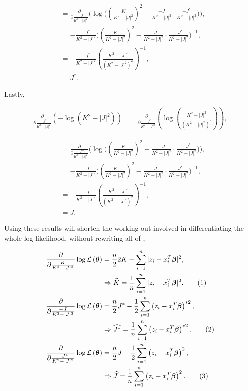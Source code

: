 \documentclass[honours,12pt]{unswthesis}
\newcommand{\ta}{\bm{\theta}}
\newcommand{\covdet}{K^{2} - |J|^{2}}
\def\implies{\Rightarrow}
\newcommand\numberthis{\addtocounter{equation}{1}\tag{\theequation}}
\numberwithin{equation}{section}
\begin{document}
\begin{align*}
    &= \frac{\partial}{\partial \frac{-J}{\covdet}} \Bigg( \log \Bigg( \left( \frac{K}{\covdet} \right)^{2} - \frac{-J}{\covdet} \cdot \frac{-J^{*}}{\covdet} \Bigg) \Bigg),\\
    &= -\frac{-J^{*}}{\covdet} \Bigg( \left( \frac{K}{\covdet} \right)^{2} - \frac{-J}{\covdet} \cdot \frac{-J^{*}}{\covdet} \Bigg)^{-1}, \\
    &= -\frac{-J^{*}}{\covdet} \left( \frac{\covdet}{\left( \covdet \right)^{2}} \right)^{-1},\\
    &= J^{*}.
\end{align*}

\noindent Lastly,

\begin{align*}
    \frac{\partial}{\partial \frac{-J^{*}}{\covdet}} \left( - \log{ \left( \covdet \right)} \right) &= \frac{\partial}{\partial \frac{-J^{*}}{\covdet}} \left( \log{ \left( \frac{\covdet}{\left( \covdet \right)^{2}} \right)} \right),
\end{align*}

\begin{align*}
    &= \frac{\partial}{\partial \frac{-J{*}}{\covdet}} \Bigg( \log \Bigg( \left( \frac{K}{\covdet} \right)^{2} - \frac{-J}{\covdet} \cdot \frac{-J^{*}}{\covdet} \Bigg) \Bigg),\\
    &= -\frac{-J}{\covdet} \Bigg( \left( \frac{K}{\covdet} \right)^{2} - \frac{-J}{\covdet} \cdot \frac{-J^{*}}{\covdet} \Bigg)^{-1}, \\
    &= -\frac{-J}{\covdet} \left( \frac{\covdet}{\left( \covdet \right)^{2}} \right)^{-1},\\
    &= J.
\end{align*}

\noindent Using these results will shorten the working out involved in differentiating the whole log-likelihood, without rewriting all of ,

\begin{align*}
    \frac{\partial}{\partial \frac{K}{\covdet}} \log \mathcal{L} \left( \ta \right) &= \frac{n}{2} 2 K - \sum_{i = 1}^{n} |z_{i} - x_{i}^{T} \bm{\beta} |^{2}, \\
    &\implies \widehat{K} = \frac{1}{n}\sum_{i = 1}^{n} |z_{i} - x_{i}^{T} \bm{\beta} |^{2}. \numberthis \label{Kmle}\\
    \frac{\partial}{\partial \frac{-J}{\covdet}} \log \mathcal{L} \left( \ta \right) &= \frac{n}{2} J^{*} - \frac{1}{2} \sum_{i = 1}^{n} \left( z_{i} - x_{i}^{T} \bm{\beta} \right)^{*2}, \\
    &\implies \widehat{J^{*}} = \frac{1}{n} \sum_{i = 1}^{n} \left( z_{i} - x_{i}^{T} \bm{\beta} \right)^{*2}.\numberthis \label{J*mle} \\
    \frac{\partial}{\partial \frac{-J^{*}}{\covdet}} \log \mathcal{L} \left( \ta \right) &= \frac{n}{2} J - \frac{1}{2} \sum_{i = 1}^{n} \left( z_{i} - x_{i}^{T} \bm{\beta} \right)^{2}, \\
    &\implies \widehat{J} = \frac{1}{n} \sum_{i = 1}^{n} \left( z_{i} - x_{i}^{T} \bm{\beta} \right)^{2}. \numberthis \label{Jmle}
\end{align*}
\end{document}
